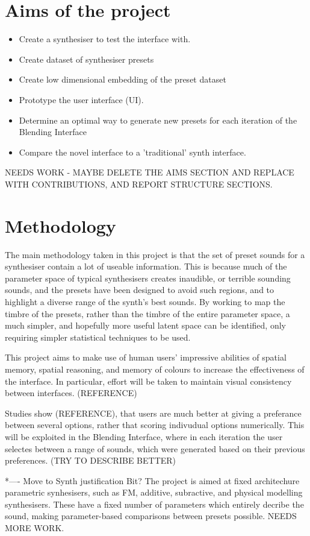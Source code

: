 \documentclass[11pt, oneside]{report}   	%
\begin{document}
\section{Aims of the project}
\begin{itemize}
	\item Create a synthesiser to test the interface with.
	\item Create dataset of synthesiser presets
	\item Create low dimensional embedding of the preset dataset
	\item Prototype the user interface (UI).
	\item Determine an optimal way to generate new presets for each iteration of the Blending Interface
	\item Compare the novel interface to a 'traditional' synth interface.
\end{itemize}
NEEDS WORK - MAYBE DELETE THE AIMS SECTION AND REPLACE WITH CONTRIBUTIONS, AND REPORT STRUCTURE SECTIONS.
\section{Methodology}
The main methodology taken in this project is that the set of preset sounds for a synthesiser contain a lot of useable information. This is because much of the parameter space of typical synthesisers creates inaudible, or terrible sounding sounds, and the presets have been designed to avoid such regions, and to highlight a diverse range of the synth's best sounds. By working to map the timbre of the presets, rather than the timbre of the entire parameter space, a much simpler, and hopefully more useful latent space can be identified, only requiring simpler statistical techniques to be used.

This project aims to make use of human users' impressive abilities of spatial memory, spatial reasoning, and memory of colours to increase the effectiveness of the interface. In particular, effort will be taken to maintain visual consistency between interfaces. (REFERENCE)

Studies show (REFERENCE), that users are much better at giving a preferance between several options, rather that scoring indivudual options numerically. This will be exploited in the Blending Interface, where in each iteration the user selectes between a range of sounds, which were generated based on their previous preferences. (TRY TO DESCRIBE BETTER)

*---- Move to Synth justification Bit?
The project is aimed at fixed architechure parametric synhesisers, such as FM, additive, subractive, and physical modelling synthesisers. These have a fixed number of parameters which entirely decribe the sound, making parameter-based comparisons between presets possible. 
NEEDS MORE WORK.
\end{document}
